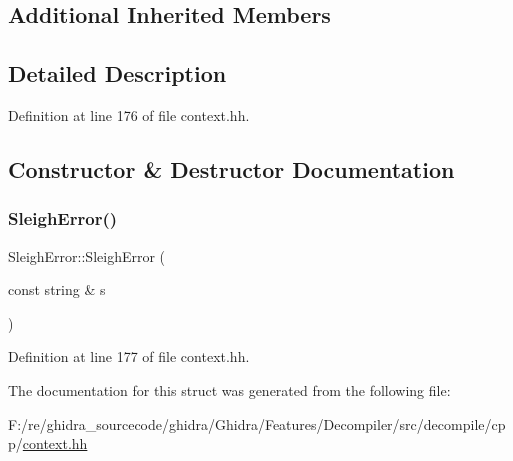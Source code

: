 \subsection*{Additional Inherited Members}


\subsection{Detailed Description}


Definition at line 176 of file context.\+hh.



\subsection{Constructor \& Destructor Documentation}
\mbox{\label{struct_sleigh_error_aca6dd3498456e656aedc7a513b464121}} 
\subsubsection{\texorpdfstring{SleighError()}{SleighError()}}
{\footnotesize\ttfamily Sleigh\+Error\+::\+Sleigh\+Error (\begin{DoxyParamCaption}\item[{const string \&}]{s }\end{DoxyParamCaption})\hspace{0.3cm}{\ttfamily [inline]}}



Definition at line 177 of file context.\+hh.



The documentation for this struct was generated from the following file\+:\begin{DoxyCompactItemize}
\item 
F\+:/re/ghidra\+\_\+sourcecode/ghidra/\+Ghidra/\+Features/\+Decompiler/src/decompile/cpp/\mbox{\hyperlink{context_8hh}{context.\+hh}}\end{DoxyCompactItemize}
